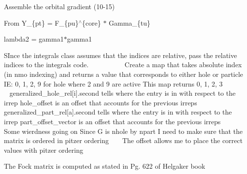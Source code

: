 Assemble the orbital gradient (10-\/15) 

From Y\+\_\+\{pt\} = F\+\_\+\{pu\}$^\wedge$\{core\} $\ast$ Gamma\+\_\+\{tu\}

lambda2 = gamma1$\ast$gamma1

S\+Ince the integrals class assumes that the indices are relative, pass the relative indices to the integrals code. ~\newline
~\newline
~\newline
~\newline
~\newline
~\newline
 Create a map that takes absolute index (in nmo indexing) and returns a value that corresponds to either hole or particle IE\+: 0, 1, 2, 9 for hole where 2 and 9 are active This map returns 0, 1, 2, 3 ~\newline
~\newline
~\newline
~\newline
~\newline
 generalized\+\_\+hole\+\_\+rel\mbox{[}i\mbox{]}.second tells where the entry is in with respect to the irrep hole\+\_\+offset is an offset that accounts for the previous irreps ~\newline
~\newline
~\newline
~\newline
 generalized\+\_\+part\+\_\+rel\mbox{[}a\mbox{]}.second tells where the entry is in with respect to the irrep part\+\_\+offset\+\_\+vector is an offset that accounts for the previous irreps ~\newline
~\newline
~\newline
 Some wierdness going on Since G is nhole by npart I need to make sure that the matrix is ordered in pitzer ordering ~\newline
~\newline
 The offset allows me to place the correct values with pitzer ordering

The Fock matrix is computed as stated in Pg. 622 of Helgaker book \mbox{\label{classforte_1_1_orbital_optimizer_a974d61893017eb0baf4c7c73321b75f8}} 
